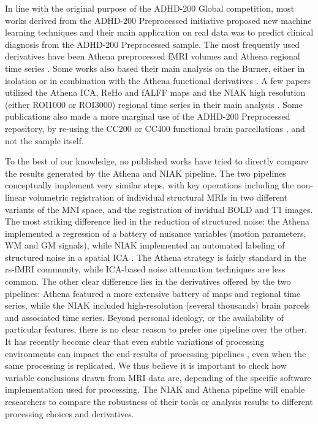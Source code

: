 \documentclass[preprint,12pt,3p]{elsarticle}
\begin{document}
In line with the original purpose of the ADHD-200 Global competition, most works derived from the ADHD-200 Preprocessed initiative proposed new machine learning techniques and their main application on real data was to predict clinical diagnosis from the ADHD-200 Preprocessed sample. The most frequently used derivatives have been Athena preprocessed fMRI volumes \citep[e.g.][]{Liang2012,Carmona2015} and Athena regional time series \citep[e.g.][]{Fujita2013,Dey2014}. Some works also based their main analysis on the Burner, either in isolation \citep[e.g.][]{Rangarajan2014,Rangarajan2015,Mahanand2013} or in combination with the Athena functional derivatives \citep[e.g.][]{Ji2011,Eloyan2012,Olivetti2014}. A few papers utilized the Athena ICA, ReHo and fALFF maps \citep[e.g.][]{Sato2012a} and the NIAK high resolution (either ROI1000 or ROI3000) regional time series in their main analysis \citep[e.g.][]{Ahn2015,Yang2015}. Some publications also made a more marginal use of the ADHD-200 Preprocessed repository, by re-using the CC200 or CC400 functional brain parcellations \citep[e.g.][]{Dey2012,Dai2012}, and not the sample itself. 
\par
To the best of our knowledge, no published works have tried to directly compare the results generated by the Athena and NIAK pipeline. The two pipelines conceptually implement very similar steps, with key operations including the non-linear volumetric registration of individual structural MRIs in two different variants of the MNI space, and the registration of invidual BOLD and T1 images. The most striking difference lied in the reduction of structured noise: the Athena implemented a regression of a battery of nuisance variables (motion parameters, WM and GM signals), while NIAK implemented an automated labeling of structured noise in a spatial ICA \citep{perlbarg2007corsica}. The Athena strategy is fairly standard in the rs-fMRI community, while ICA-based noise attenuation techniques are less common. The other clear difference lies in the derivatives offered by the two pipelines: Athena featured a more extensive battery of maps and regional time series, while the NIAK included high-resolution (several thousands) brain parcels and associated time series. Beyond personal ideology, or the availability of particular features, there is no clear reason to prefer one pipeline over the other.  It has recently become clear that even subtle variations of processing environments can impact the end-results of processing pipelines \citep{Glatard2015-we}, even when the same processing is replicated. We thus believe it is important to check how variable conclusions drawn from MRI data are, depending of the specific software implementation used for processing. The NIAK and Athena pipeline will enable researchers to compare the robustness of their tools or analysis results to different processing choices and derivatives. 
\end{document}
